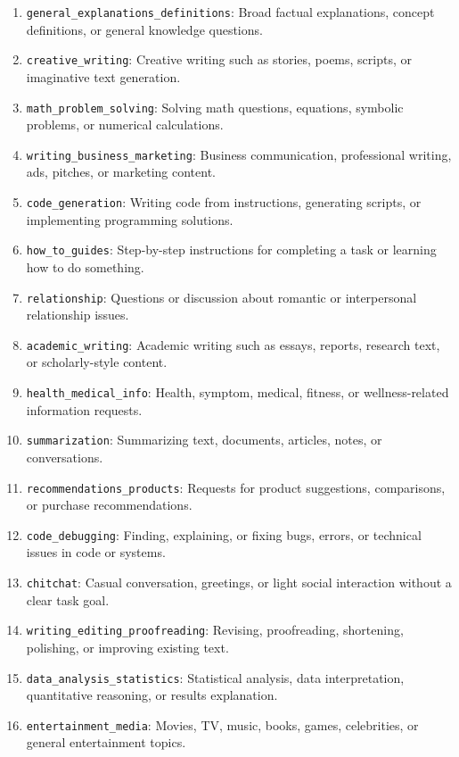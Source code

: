\documentclass{article}
\begin{document}
\begin{enumerate}
    \item \texttt{general\_explanations\_definitions}: Broad factual explanations, concept definitions, or general knowledge questions.
    \item \texttt{creative\_writing}: Creative writing such as stories, poems, scripts, or imaginative text generation.
    \item \texttt{math\_problem\_solving}: Solving math questions, equations, symbolic problems, or numerical calculations.
    \item \texttt{writing\_business\_marketing}: Business communication, professional writing, ads, pitches, or marketing content.
    \item \texttt{code\_generation}: Writing code from instructions, generating scripts, or implementing programming solutions.
    \item \texttt{how\_to\_guides}: Step-by-step instructions for completing a task or learning how to do something.
    \item \texttt{relationship}: Questions or discussion about romantic or interpersonal relationship issues.
    \item \texttt{academic\_writing}: Academic writing such as essays, reports, research text, or scholarly-style content.
    \item \texttt{health\_medical\_info}: Health, symptom, medical, fitness, or wellness-related information requests.
    \item \texttt{summarization}: Summarizing text, documents, articles, notes, or conversations.
    \item \texttt{recommendations\_products}: Requests for product suggestions, comparisons, or purchase recommendations.
    \item \texttt{code\_debugging}: Finding, explaining, or fixing bugs, errors, or technical issues in code or systems.
    \item \texttt{chitchat}: Casual conversation, greetings, or light social interaction without a clear task goal.
    \item \texttt{writing\_editing\_proofreading}: Revising, proofreading, shortening, polishing, or improving existing text.
    \item \texttt{data\_analysis\_statistics}: Statistical analysis, data interpretation, quantitative reasoning, or results explanation.
    \item \texttt{entertainment\_media}: Movies, TV, music, books, games, celebrities, or general entertainment topics.

\end{enumerate}
\end{document}

